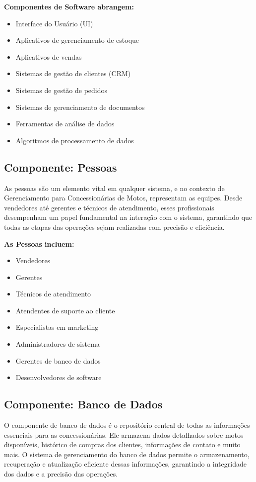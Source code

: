 	\textbf{Componentes de Software abrangem:}
	
	\begin{itemize}
		\item Interface do Usuário (UI)
		\item Aplicativos de gerenciamento de estoque
		\item Aplicativos de vendas
		\item Sistemas de gestão de clientes (CRM)
		\item Sistemas de gestão de pedidos
		\item Sistemas de gerenciamento de documentos
		\item Ferramentas de análise de dados
		\item Algoritmos de processamento de dados
	\end{itemize}
	
	
     \subsection{Componente: Pessoas}
	As pessoas são um elemento vital em qualquer sistema, e no contexto de Gerenciamento para Concessionárias de Motos, representam as equipes. Desde vendedores até gerentes e técnicos de atendimento, esses profissionais desempenham um papel fundamental na interação com o sistema, garantindo que todas as etapas das operações sejam realizadas com precisão e eficiência.
	
	\textbf{As Pessoas incluem:}
	
	\begin{itemize}
		\item Vendedores
		\item Gerentes
		\item Técnicos de atendimento
		\item Atendentes de suporte ao cliente
		\item Especialistas em marketing
		\item Administradores de sistema
		\item Gerentes de banco de dados
		\item Desenvolvedores de software
	\end{itemize}


     \subsection{Componente: Banco de Dados}
     O componente de banco de dados é o repositório central de todas as informações essenciais para as concessionárias. Ele armazena dados detalhados sobre motos disponíveis, histórico de compras dos clientes, informações de contato e muito mais. O sistema de gerenciamento do banco de dados permite o armazenamento, recuperação e atualização eficiente dessas informações, garantindo a integridade dos dados e a precisão das operações.
     
